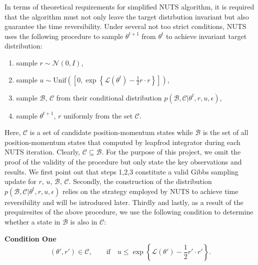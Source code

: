 \documentclass{article}
\begin{document}
In terms of theoretical requirements for simplified NUTS algorithm, it is required that the algorithm must not only leave the target distrbution invariant but also guarantee the time reversibility. Under several not too strict conditions, NUTS uses the following procedure to sample $\theta^{t+1}$ from $\theta^{t}$ to achieve invariant target distribution:
\begin{enumerate}

\item sample $r\sim\mathcal{N}(0,I)$,
\item sample $u\sim\text{Unif}\left(\left[0,\exp\left\{\mathcal{L}(\theta^t)-\frac{1}{2}r\cdot{r}\right\}\right]\right)$,
\item sample $\mathcal{B}$, $\mathcal{C}$ from their conditional distribution $p(\mathcal{B},\mathcal{C}|\theta^t,r,u,\epsilon)$,
\item sample $\theta^{t+1}$, $r$ uniformly from the set $\mathcal{C}$.

\end{enumerate}

Here, $\mathcal{C}$ is a set of candidate position-momentum states while $\mathcal{B}$ is the set of all position-momentum states that computed by leapfrod integrator during each NUTS iteration. Clearly, $\mathcal{C}\subseteq\mathcal{B}$. For the purpose of this project, we omit the proof of the validity of the procedure but only state the key observations and results. We first point out that steps 1,2,3 constitute a valid Gibbs sampling update for $r$, $u$, $\mathcal{B}$, $\mathcal{C}$. Secondly, the construction of the distribution $p(\mathcal{B},\mathcal{C}|\theta^t,r,u,\epsilon)$ relies on the strategy employed by NUTS to achieve time reversibility and will be introduced later. Thirdly and lastly, as a result of the prequiresites of the above procedure, we use the following condition to determine whether a state in $\mathcal{B}$ is also in $\mathcal{C}$:

\textbf{Condition One}
$$(\theta',r')\in\mathcal{C},\qquad \text{if}\quad u\leq \exp\left\{\mathcal{L}(\theta')-\frac{1}{2}r'\cdot r'\right\}.$$
\end{document}
